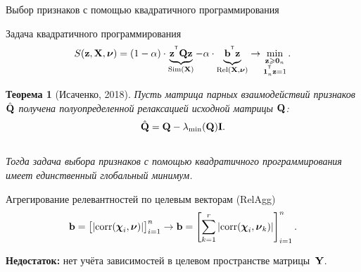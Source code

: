 \documentclass[10pt]{beamer}
\newtheorem{rustheorem}{Теорема}
\begin{document}
\begin{frame}{Выбор признаков с помощью квадратичного программирования}

	\begin{block}{Задача квадратичного программирования}
		\vspace{-0.3cm}
		\[
		S(\mathbf{z}, \mathbf{X}, \boldsymbol{\nu}) = (1 - \alpha) \cdot \underbrace{\mathbf{z}^{^{\text{\tiny\sffamily\upshape\mdseries T}}} \mathbf{Q} \mathbf{z}}_{\text{Sim}(\mathbf{X})} - \alpha \cdot \underbrace{\vphantom{()} \mathbf{b}^{^{\text{\tiny\sffamily\upshape\mdseries T}}} \mathbf{z}}_{\text{Rel}(\mathbf{X}, \boldsymbol{\nu})} \rightarrow \min_{\substack{\mathbf{z} \geqslant \boldsymbol{0}_n \\ \boldsymbol{1}_n^{^{\text{\tiny\sffamily\upshape\mdseries T}}} \mathbf{z}=1}}.
		\]
		\vspace{-0.5cm}
	\end{block}

	\begin{rustheorem}[Исаченко, 2018]
		Пусть матрица парных взаимодействий признаков $\hat{\mathbf{Q}}$ получена полуопределенной релаксацией исходной матрицы $\mathbf{Q}$:
		\vspace{-0.2cm}
		\begin{equation*}
			\hat{\mathbf{Q}} = \mathbf{Q} - \lambda_{\min}(\mathbf{Q}) \mathbf{I}.
		\end{equation*}
		\vspace{-0.7cm} \\
		Тогда задача выбора признаков с помощью квадратичного программирования имеет единственный глобальный минимум.
	\end{rustheorem}
	\begin{block}{Агрегирование релевантностей по целевым векторам (RelAgg)}
	\vspace{-0.2cm}
		\[
			\mathbf{b} = \bigl[\left|\text{corr}(\boldsymbol{\chi}_i, \boldsymbol{\nu})\right|\bigr]_{i=1}^n \rightarrow \mathbf{b} = \left[\sum_{k=1}^r\left|\text{corr}(\boldsymbol{\chi}_i, \boldsymbol{\nu}_k)\right|\right]_{i=1}^n.
		\]
	\end{block}
	{\bf Недостаток:} нет учёта зависимостей в целевом пространстве матрицы~$\mathbf{Y}$. 
	
\end{frame}
\end{document}
